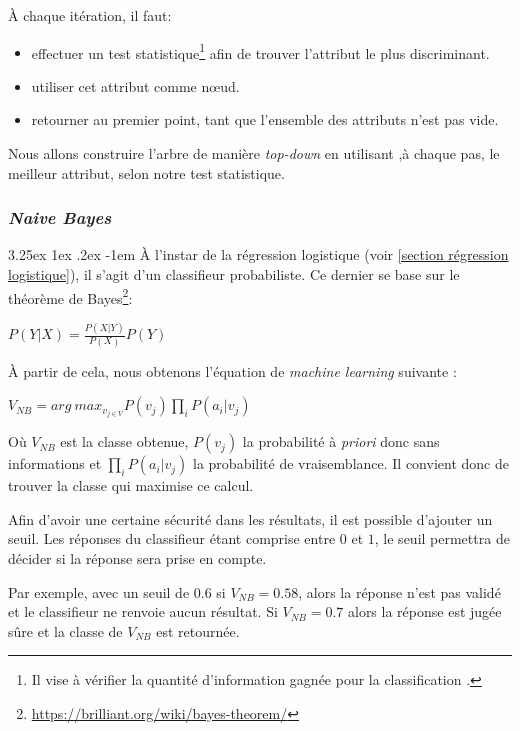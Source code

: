 \documentclass[a4paper, 11pt]{article}
\makeatletter
\renewcommand\paragraph{\@startsection{paragraph}{5}{\z@}%
  {3.25ex \@plus1ex \@minus.2ex}%
  {-1em}%
  {\normalfont\normalsize\bfseries}}
\makeatother
\begin{document}
À chaque itération, il faut:
\begin{itemize}
 \item effectuer un test statistique\footnote{Il vise à vérifier la quantité d'information gagnée pour 
 la classification \cite{id3}.} afin de trouver l'attribut le plus discriminant.
 \item utiliser cet attribut comme nœud.
 \item retourner au premier point, tant que l'ensemble des attributs n'est pas vide.
\end{itemize}

Nous allons construire l'arbre de manière \textit{top-down} en utilisant ,à chaque pas, le meilleur attribut, selon notre test
statistique.


\subsubsection{\textit{Naive Bayes}}\label{section naive bayes}
\paragraph{}
À l'instar de la régression logistique (voir \ref{section régression logistique}), il s'agit d'un classifieur probabiliste. 
Ce dernier se base sur le théorème de Bayes\footnote{\url{https://brilliant.org/wiki/bayes-theorem/}}:
\begin{center}
$P(Y|X) = \frac{P(X|Y)}{P(X)}P(Y)$
\end{center}

À partir de cela, nous obtenons l'équation de \textit{machine learning} suivante \cite{machine_learning_automated_trading}:
\begin{center}
$V_{NB} = arg\ max_{v_{j \in V}} P(v_j) \prod\limits_i P(a_i | v_j)$
\end{center}
Où $V_{NB}$ est la classe obtenue, $P(v_j)$ la probabilité à \textit{priori} donc sans informations 
et $\prod\limits_i P(a_i | v_j)$ la probabilité de vraisemblance.
Il convient donc de trouver la classe qui maximise ce calcul.

Afin d'avoir une certaine sécurité dans les résultats, il est possible d'ajouter un seuil. 
Les réponses du classifieur étant comprise entre $0$ et $1$, le seuil permettra de décider si la réponse sera prise en compte.

Par exemple, avec un seuil de $0.6$ si $V_{NB} = 0.58$, alors la réponse n'est pas validé et le classifieur ne renvoie aucun
résultat. Si $V_{NB} = 0.7$ alors la réponse est jugée sûre et la classe de $V_{NB}$ est retournée. 
\end{document}
